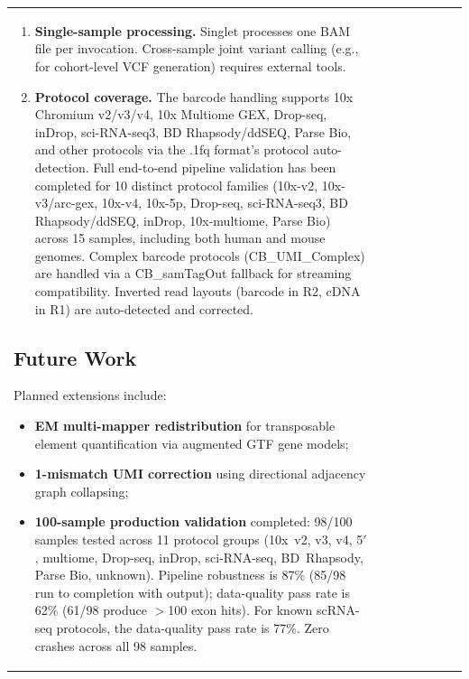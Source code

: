 \documentclass[11pt,a4paper]{article}
\begin{document}
\begin{table}[t]
\begin{tabular}{llllrrrr}
{\begin{enumerate}
    \item \textbf{Single-sample processing.} Singlet processes one BAM file per invocation. Cross-sample joint variant calling (e.g., for cohort-level VCF generation) requires external tools.
    
    \item \textbf{Protocol coverage.} The barcode handling supports 10x Chromium v2/v3/v4, 10x Multiome GEX, Drop-seq, inDrop, sci-RNA-seq3, BD Rhapsody/ddSEQ, Parse Bio, and other protocols via the .1fq format's protocol auto-detection. Full end-to-end pipeline validation has been completed for 10 distinct protocol families (10x-v2, 10x-v3/arc-gex, 10x-v4, 10x-5p, Drop-seq, sci-RNA-seq3, BD Rhapsody/ddSEQ, inDrop, 10x-multiome, Parse Bio) across 15 samples, including both human and mouse genomes. Complex barcode protocols (CB\_UMI\_Complex) are handled via a CB\_samTagOut fallback for streaming compatibility. Inverted read layouts (barcode in R2, cDNA in R1) are auto-detected and corrected.
\end{enumerate}

\subsection{Future Work}

Planned extensions include:
\begin{itemize}
    \item \textbf{EM multi-mapper redistribution} for transposable element quantification via augmented GTF gene models;
    \item \textbf{1-mismatch UMI correction} using directional adjacency graph collapsing;
    \item \textbf{100-sample production validation} completed: 98/100 samples tested across 11 protocol groups (10x~v2, v3, v4, 5$'$, multiome, Drop-seq, inDrop, sci-RNA-seq, BD~Rhapsody, Parse Bio, unknown). Pipeline robustness is 87\% (85/98 run to completion with output); data-quality pass rate is 62\% (61/98 produce $>$100 exon hits). For known scRNA-seq protocols, the data-quality pass rate is 77\%. Zero crashes across all 98 samples.
\end{itemize}

}
\end{tabular}
\end{table}
\end{document}
